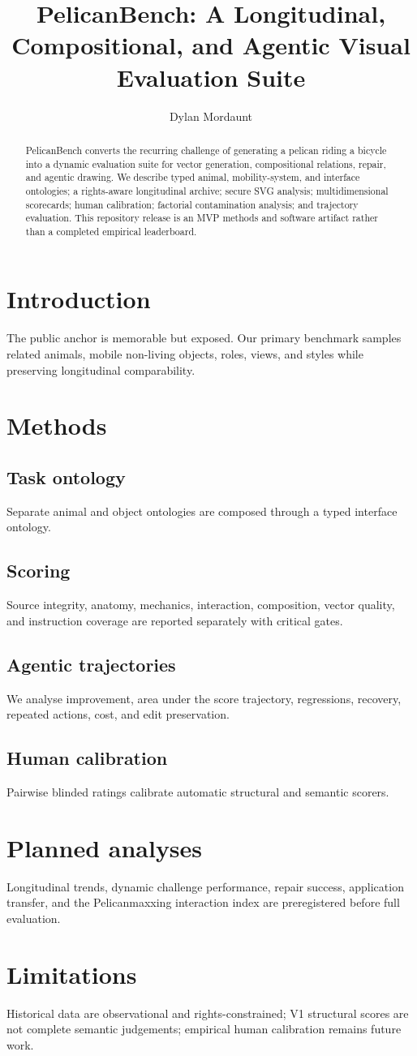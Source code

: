 \documentclass{article}
\title{PelicanBench: A Longitudinal, Compositional, and Agentic Visual Evaluation Suite}
\author{Dylan Mordaunt}
\date{}
\begin{document}
\maketitle
\begin{abstract}
PelicanBench converts the recurring challenge of generating a pelican riding a bicycle into a dynamic evaluation suite for vector generation, compositional relations, repair, and agentic drawing. We describe typed animal, mobility-system, and interface ontologies; a rights-aware longitudinal archive; secure SVG analysis; multidimensional scorecards; human calibration; factorial contamination analysis; and trajectory evaluation. This repository release is an MVP methods and software artifact rather than a completed empirical leaderboard.
\end{abstract}
\section{Introduction}
The public anchor is memorable but exposed. Our primary benchmark samples related animals, mobile non-living objects, roles, views, and styles while preserving longitudinal comparability.
\section{Methods}
\subsection{Task ontology} Separate animal and object ontologies are composed through a typed interface ontology.
\subsection{Scoring} Source integrity, anatomy, mechanics, interaction, composition, vector quality, and instruction coverage are reported separately with critical gates.
\subsection{Agentic trajectories} We analyse improvement, area under the score trajectory, regressions, recovery, repeated actions, cost, and edit preservation.
\subsection{Human calibration} Pairwise blinded ratings calibrate automatic structural and semantic scorers.
\section{Planned analyses}
Longitudinal trends, dynamic challenge performance, repair success, application transfer, and the Pelicanmaxxing interaction index are preregistered before full evaluation.
\section{Limitations}
Historical data are observational and rights-constrained; V1 structural scores are not complete semantic judgements; empirical human calibration remains future work.
\end{document}
